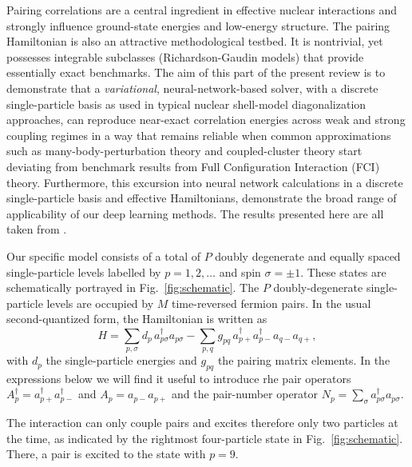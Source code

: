 
Pairing correlations are a central ingredient in effective nuclear
interactions and strongly influence ground-state energies and
low-energy structure. The pairing Hamiltonian is also an attractive
methodological testbed. It is nontrivial, yet possesses integrable
subclasses (Richardson-Gaudin models) \cite{Gaudin:1976} that provide essentially exact
benchmarks. The aim of this part of the present review is to
demonstrate that a \emph{variational}, neural-network-based solver,
with a discrete single-particle basis as used in typical nuclear
shell-model diagonalization approaches, can reproduce near-exact
correlation energies across weak and strong coupling regimes in a way
that remains reliable when common approximations such as
many-body-perturbation theory \cite{Paldus2006,shavittbartlett2009,morten_book} 
and coupled-cluster theory \cite{shavittbartlett2009,hagen2014} start
deviating from benchmark results from Full Configuration Interaction (FCI)
theory. Furthermore, this excursion into neural network calculations
in a discrete single-particle basis and effective Hamiltonians,
demonstrate the broad range of applicability of our deep learning
methods. The results presented here are all taken from \cite{rigo2023}.



Our specific model consists of a total of $P$ doubly degenerate and equally spaced
single-particle levels labelled by $p=1,2,\dots$ and spin $\sigma=\pm
1$.  These states are schematically portrayed in
Fig.~\ref{fig:schematic}.  
The $P$ doubly-degenerate single-particle levels are occupied by $M$ time-reversed fermion pairs. In the usual
second-quantized form, the Hamiltonian is written as
\begin{equation}
H=\sum_{p,\sigma} d_p\, a_{p\sigma}^\dagger a_{p\sigma}
-\sum_{p,q} g_{pq}\, a_{p+}^\dagger a_{p-}^\dagger a_{q-} a_{q+},
\label{eq:H_full}
\end{equation}
with $d_p$ the single-particle energies and $g_{pq}$ the pairing matrix elements. 
In the expressions below we will find it useful to introduce rhe pair operators $A_p^\dagger=a_{p+}^\dagger a_{p-}^\dagger$ and $A_p=a_{p-}a_{p+}$ and the pair-number operator
$N_p=\sum_{\sigma}a_{p\sigma}^\dagger a_{p\sigma}$.



The interaction can only couple pairs and excites therefore only two
particles at the time, as indicated by the rightmost four-particle
state in Fig.~\ref{fig:schematic}. There, a pair is excited to the
state with $p=9$.   

